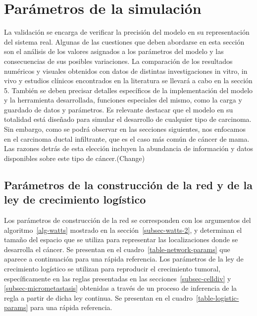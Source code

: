 \chapter{Par\'ametros de la simulaci\'on}\label{chapter:proposal}

La validación se encarga de verificar la precisión del modelo en su representación del sistema real. Algunas de las cuestiones que deben abordarse en esta sección son el análisis de los valores asignados a los parámetros del modelo y las consecuencias de sus posibles variaciones. La comparación de los resultados numéricos y visuales obtenidos con datos de distintas investigaciones in vitro, in vivo y estudios clínicos encontrados en la literatura se llevará a cabo en la sección 5. Tambi\'en se deben precisar detalles espec\'ificos de la implementaci\'on del modelo y la herramienta desarrollada, funciones especiales del mismo, como la carga y guardado de datos y par\'ametros. Es relevante destacar que el modelo en su totalidad está diseñado para simular el desarrollo de cualquier tipo de carcinoma. Sin embargo, como se podrá observar en las secciones siguientes, nos enfocamos en el carcinoma ductal infiltrante, que es el caso más común de cáncer de mama. Las razones detrás de esta elección incluyen la abundancia de información y datos disponibles sobre este tipo de cáncer.(Change)

\section{Par\'ametros de la construcci\'on de la red y de la ley de crecimiento log\'istico}
\label{subsec-network-param}
Los par\'ametros de construcci\'on de la red se corresponden con los argumentos del algoritmo~\ref{alg-watts} mostrado en la secci\'on~\ref{subsec-watts-2}, y determinan el tama\~no del espacio que se utiliza para representar las localizaciones donde se desarrolla el c\'ancer. Se presentan en el cuadro~\ref{table-network-params} que aparece a continuaci\'on para una r\'apida referencia. Los par\'ametros de la ley de crecimiento log\'istico se utilizan para reproducir el crecimiento tumoral, espec\'ificamente en las reglas presentadas en las secciones~\ref{subsec-celldiv} y \ref{subsec-micrometastasis} obtenidas a trav\'es de un proceso de inferencia de la regla a partir de dicha ley continua. Se presentan en el cuadro~\ref{table-logistic-params} para una r\'apida referencia.

